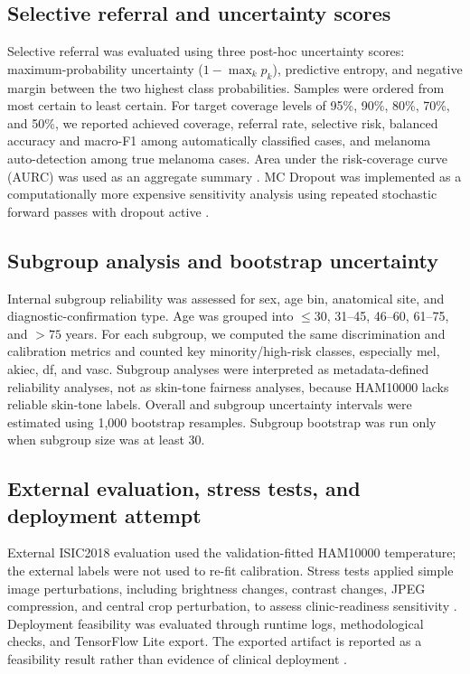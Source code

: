 \documentclass[11pt,a4paper]{article}
\newcommand{\dataset}{HAM10000}
\newcommand{\isic}{ISIC2018}
\begin{document}
\subsection{Selective referral and uncertainty scores}

Selective referral was evaluated using three post-hoc uncertainty scores: maximum-probability uncertainty ($1-\max_k p_k$), predictive entropy, and negative margin between the two highest class probabilities. Samples were ordered from most certain to least certain. For target coverage levels of 95\%, 90\%, 80\%, 70\%, and 50\%, we reported achieved coverage, referral rate, selective risk, balanced accuracy and macro-F1 among automatically classified cases, and melanoma auto-detection among true melanoma cases. Area under the risk-coverage curve (AURC) was used as an aggregate summary \citep{elyaniv2010selective,geifman2019selectivenet}. MC Dropout was implemented as a computationally more expensive sensitivity analysis using repeated stochastic forward passes with dropout active \citep{gal2016dropout,lakshminarayanan2017ensembles}.

\subsection{Subgroup analysis and bootstrap uncertainty}

Internal subgroup reliability was assessed for sex, age bin, anatomical site, and diagnostic-confirmation type. Age was grouped into $\leq30$, 31--45, 46--60, 61--75, and $>75$ years. For each subgroup, we computed the same discrimination and calibration metrics and counted key minority/high-risk classes, especially mel, akiec, df, and vasc. Subgroup analyses were interpreted as metadata-defined reliability analyses, not as skin-tone fairness analyses, because \dataset{} lacks reliable skin-tone labels. Overall and subgroup uncertainty intervals were estimated using 1,000 bootstrap resamples. Subgroup bootstrap was run only when subgroup size was at least 30.

\subsection{External evaluation, stress tests, and deployment attempt}

External \isic{} evaluation used the validation-fitted \dataset{} temperature; the external labels were not used to re-fit calibration. Stress tests applied simple image perturbations, including brightness changes, contrast changes, JPEG compression, and central crop perturbation, to assess clinic-readiness sensitivity \citep{young2021stress,ovadia2019uncertainty}. Deployment feasibility was evaluated through runtime logs, methodological checks, and TensorFlow Lite export. The exported artifact is reported as a feasibility result rather than evidence of clinical deployment \citep{tensorflow2024tflite,thomas2023deployment}.
\end{document}
